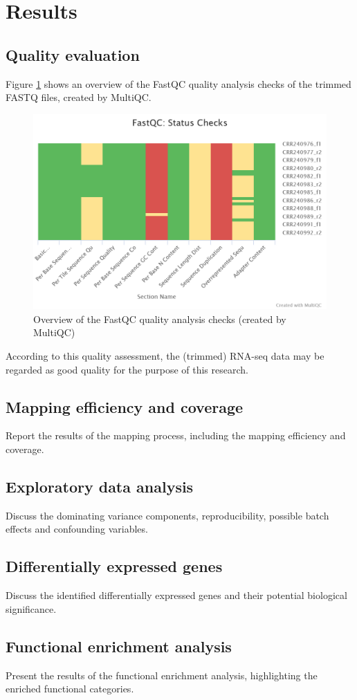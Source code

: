 \section{Results}

\subsection{Quality evaluation}

Figure \ref{fig:0.1-MultiQC_FastQC_status_checks} shows an overview of the FastQC quality analysis checks of the trimmed FASTQ files, created by MultiQC.

\begin{figure}[htbp]
    \caption{Overview of the FastQC quality analysis checks (created by MultiQC)}
    \label{fig:0.1-MultiQC_FastQC_status_checks}
    \includegraphics[width=\textwidth]{../../results/multiqc/Plot-Exports/fastqc-status-check-heatmap}
\end{figure}

According to this quality assessment, the (trimmed) RNA-seq data may be regarded as good quality for the purpose of this research.


\subsection{Mapping efficiency and coverage}
Report the results of the mapping process, including the mapping efficiency and coverage.

\subsection{Exploratory data analysis}
Discuss the dominating variance components, reproducibility, possible batch effects and confounding variables.

\subsection{Differentially expressed genes}
Discuss the identified differentially expressed genes and their potential biological significance.

\subsection{Functional enrichment analysis}
Present the results of the functional enrichment analysis, highlighting the enriched functional categories.